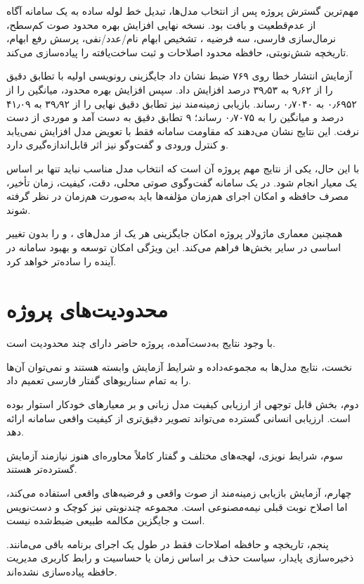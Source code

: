 مهم‌ترین گسترش پروژه پس از انتخاب مدل‌ها، تبدیل خط لوله ساده به
یک سامانه آگاه از عدم‌قطعیت و بافت بود. نسخه نهایی افزایش بهره
محدود صوت کم‌سطح، نرمال‌سازی فارسی، سه فرضیه ، تشخیص
ابهام نام/عدد/نفی، پرسش رفع ابهام، تاریخچه شش‌نوبتی، حافظه محدود
اصلاحات و ثبت ساخت‌یافته را پیاده‌سازی می‌کند.

آزمایش انتشار خطا روی ۷۶۹ ضبط نشان داد جایگزینی رونویسی اولیه
با  تطابق دقیق  را از ۹٫۶۲ به ۳۹٫۵۳ درصد
افزایش داد. سپس افزایش بهره محدود، میانگین  را از ۰٫۶۹۵۲
به ۰٫۷۰۴۰ رساند. بازیابی زمینه‌مند نیز تطابق دقیق نهایی را از
۳۹٫۹۲ به ۴۱٫۰۹ درصد و میانگین  را به ۰٫۷۰۷۵ رساند؛ ۹
تطابق دقیق به دست آمد و موردی از دست نرفت. این نتایج نشان می‌دهند
که مقاومت سامانه فقط با تعویض مدل افزایش نمی‌یابد و کنترل ورودی
و گفت‌وگو نیز اثر قابل‌اندازه‌گیری دارد.

با این حال، یکی از نتایج مهم پروژه آن است که انتخاب مدل مناسب
نباید تنها بر اساس یک معیار انجام شود.
در یک سامانه گفت‌وگوی صوتی محلی، دقت، کیفیت، زمان تأخیر،
مصرف حافظه و امکان اجرای هم‌زمان مؤلفه‌ها باید به‌صورت
هم‌زمان در نظر گرفته شوند.

همچنین معماری ماژولار پروژه امکان جایگزینی هر یک از مدل‌های
،  و  را بدون تغییر اساسی در سایر بخش‌ها فراهم
می‌کند.
این ویژگی امکان توسعه و بهبود سامانه در آینده را ساده‌تر
خواهد کرد.


\section{محدودیت‌های پروژه}

با وجود نتایج به‌دست‌آمده، پروژه حاضر دارای چند محدودیت است.

نخست، نتایج مدل‌ها به مجموعه‌داده و شرایط آزمایش وابسته هستند
و نمی‌توان آن‌ها را به تمام سناریوهای گفتار فارسی تعمیم داد.

دوم، بخش قابل توجهی از ارزیابی کیفیت مدل زبانی و  بر
معیارهای خودکار استوار بوده است.
ارزیابی انسانی گسترده می‌تواند تصویر دقیق‌تری از کیفیت واقعی
سامانه ارائه دهد.

سوم، شرایط نویزی، لهجه‌های مختلف و گفتار کاملاً محاوره‌ای
هنوز نیازمند آزمایش گسترده‌تر هستند.

چهارم، آزمایش بازیابی زمینه‌مند از صوت واقعی و فرضیه‌های واقعی
استفاده می‌کند، اما اصلاح نوبت قبلی نیمه‌مصنوعی است. مجموعه
چندنوبتی نیز کوچک و دست‌نویس است و جایگزین مکالمه طبیعی ضبط‌شده
نیست.

پنجم، تاریخچه و حافظه اصلاحات فقط در طول یک اجرای برنامه باقی
می‌مانند. ذخیره‌سازی پایدار، سیاست حذف بر اساس زمان یا حساسیت و
رابط کاربری مدیریت حافظه پیاده‌سازی نشده‌اند.


